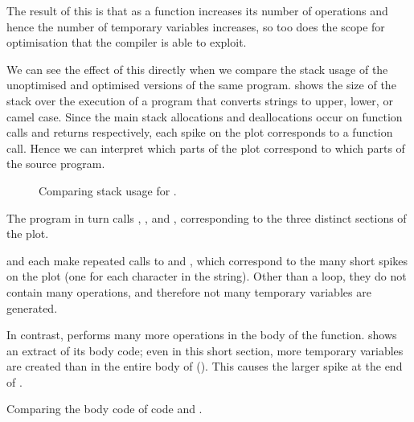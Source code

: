\documentclass[00-main.tex]{subfiles}
\begin{document}
The result of this is that as a function increases its number of operations and hence the number of temporary variables increases, so too does the scope for optimisation that the compiler is able to exploit.

We can see the effect of this directly when we compare the stack usage of the unoptimised and optimised versions of the same program.
 shows the size of the stack over the execution of a program that converts strings to upper, lower, or camel case.
Since the main stack allocations and deallocations occur on function calls and returns respectively, each spike on the plot corresponds to a function call.
Hence we can interpret which parts of the plot correspond to which parts of the source program.

\begin{figure}[p]
  \centering
  \caption{Comparing stack usage for .}
  \label{fig:comparing stack usage for case.c} %
\end{figure}

The program in turn calls , , and , corresponding to the three distinct sections of the plot.

 and  each make repeated calls to  and , which correspond to the many short spikes on the plot (one for each character in the string).
Other than a  loop, they do not contain many operations, and therefore not many temporary variables are generated.

In contrast,  performs many more operations in the body of the function.
 shows an extract of its body code; even in this short section, more temporary variables are created than in the entire body of  ().
This causes the larger spike at the end of .

\begin{listing}[p]
  \hfill
  \caption{Comparing the body code of  code and .}
  \label{lst:caseupper and casecamel body code}
\end{listing}
\end{document}
